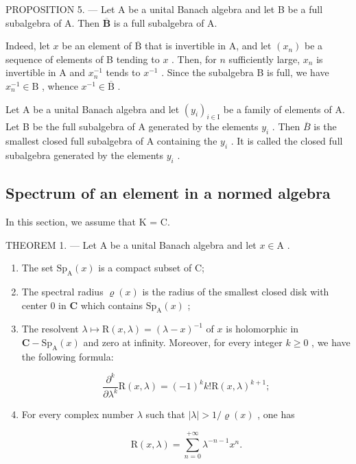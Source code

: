 PROPOSITION 5. --- Let A be a unital Banach algebra and let B be a full subalgebra of A. Then \(\overline{\mathbf{B}}\) is a full subalgebra of A.

Indeed, let \(x\) be an element of \(\overline{\mathrm{B}}\) that is invertible in A, and let \((x_n)\) be a sequence of elements of B tending to \(x\) . Then, for \(n\) sufficiently large, \(x_n\) is invertible in A and \(x_n^{-1}\) tends to \(x^{-1}\) . Since the subalgebra B is full, we have \(x_n^{-1} \in \mathrm{B}\) , whence \(x^{-1} \in \overline{\mathrm{B}}\) .

Let A be a unital Banach algebra and let \((y_{i})_{i\in\mathrm{I}}\) be a family of elements of A. Let B be the full subalgebra of A generated by the elements \(y_{i}\) . Then \(\overline{B}\) is the smallest closed full subalgebra of A containing the \(y_{i}\) . It is called the closed full subalgebra generated by the elements \(y_{i}\) .

\subsection{Spectrum of an element in a normed algebra}

In this section, we assume that K = C.

THEOREM 1. --- Let A be a unital Banach algebra and let \(x \in \mathrm{A}\) .

\begin{enumerate}
\def\labelenumi{\alph{enumi})}
\item
  The set \(\mathrm{Sp}_{\mathrm{A}}(x)\) is a compact subset of C;
\item
  The spectral radius \(\varrho(x)\) is the radius of the smallest closed disk with center 0 in \(\mathbf{C}\) which contains \(\mathrm{Sp}_{\mathrm{A}}(x)\) ;
\item
  The resolvent \(\lambda \mapsto \mathrm{R}(x,\lambda) = (\lambda -x)^{-1}\) of \(x\) is holomorphic in \(\mathbf{C} - \mathrm{Sp}_{\mathrm{A}}(x)\) and zero at infinity. Moreover, for every integer \(k\geqslant 0\) , we have the
following formula:

\[
\frac {\partial^ {k}}{\partial \lambda^ {k}} \mathrm{R} (x, \lambda) = (- 1) ^ {k} k! \mathrm{R} (x, \lambda) ^ {k + 1};
\]

\item
  For every complex number \(\lambda\) such that \(|\lambda| > 1 / \varrho(x)\) , one has

\[
\mathrm{R} (x, \lambda) = \sum_ {n = 0} ^ {+ \infty} \lambda^ {- n - 1} x ^ {n}.
\]

\end{enumerate}

